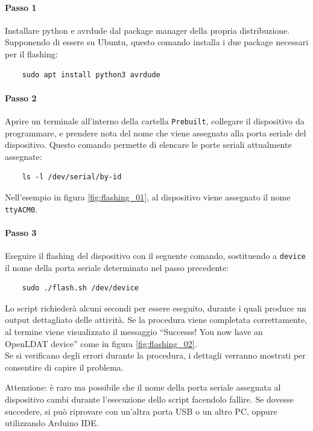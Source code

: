 \paragraph{Passo 1} Installare python e avrdude dal package manager della propria distribuzione. Supponendo di essere su Ubuntu, questo comando installa i due package necessari per il flashing:
\begin{verbatim}
	sudo apt install python3 avrdude
\end{verbatim}

\paragraph{Passo 2} Aprire un terminale all'interno della cartella \texttt{Prebuilt}, collegare il dispositivo da programmare, e prendere nota del nome che viene assegnato alla porta seriale del dispositivo. Questo comando permette di elencare le porte seriali attualmente assegnate:
\begin{verbatim}
	ls -l /dev/serial/by-id
\end{verbatim}

Nell'esempio in figura \ref{fig:flashing_01}, al dispositivo viene assegnato il nome \texttt{ttyACM0}.

\paragraph{Passo 3} Eseguire il flashing del dispositivo con il seguente comando, sostituendo a \texttt{device} il nome della porta seriale determinato nel passo precedente:
\begin{verbatim}
	sudo ./flash.sh /dev/device
\end{verbatim}

Lo script richiederà alcuni secondi per essere eseguito, durante i quali produce un output dettagliato delle attività. Se la procedura viene completata correttamente, al termine viene visualizzato il messaggio ``Successs! You now have an OpenLDAT device'' come in figura \ref{fig:flashing_02}.\\
Se si verificano degli errori durante la procedura, i dettagli verranno mostrati per consentire di capire il problema.

Attenzione: è raro ma possibile che il nome della porta seriale assegnata al dispositivo cambi durante l'esecuzione dello script facendolo fallire. Se dovesse succedere, si può riprovare con un'altra porta USB o un altro PC, oppure utilizzando Arduino IDE.

